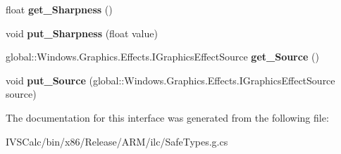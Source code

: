 \begin{DoxyCompactItemize}
\item 
\mbox{\label{interface_microsoft_1_1_graphics_1_1_canvas_1_1_effects_1_1_i_transform2_d_effect_a68ba1c90a21490b6ceaa03f39f1a1c01}} 
float {\bfseries get\+\_\+\+Sharpness} ()
\item 
\mbox{\label{interface_microsoft_1_1_graphics_1_1_canvas_1_1_effects_1_1_i_transform2_d_effect_aa2e12a86a9e8cf3335707e71b6601b29}} 
void {\bfseries put\+\_\+\+Sharpness} (float value)
\item 
\mbox{\label{interface_microsoft_1_1_graphics_1_1_canvas_1_1_effects_1_1_i_transform2_d_effect_a808f1b49b9663c0610d2495cf643268f}} 
global\+::\+Windows.\+Graphics.\+Effects.\+I\+Graphics\+Effect\+Source {\bfseries get\+\_\+\+Source} ()
\item 
\mbox{\label{interface_microsoft_1_1_graphics_1_1_canvas_1_1_effects_1_1_i_transform2_d_effect_ae417421258d1e16d1da95390cce154d5}} 
void {\bfseries put\+\_\+\+Source} (global\+::\+Windows.\+Graphics.\+Effects.\+I\+Graphics\+Effect\+Source source)
\end{DoxyCompactItemize}


The documentation for this interface was generated from the following file\+:\begin{DoxyCompactItemize}
\item 
I\+V\+S\+Calc/bin/x86/\+Release/\+A\+R\+M/ilc/Safe\+Types.\+g.\+cs\end{DoxyCompactItemize}
